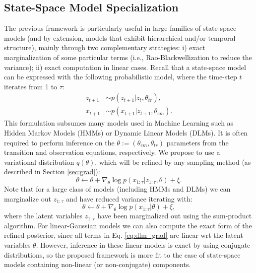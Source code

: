 \subsection{State-Space Model Specialization}\label{sec:ss}
The previous framework is particularly useful in large families of state-space models (and by extension, models that exhibit hierarchical and/or temporal structure), mainly through two complementary strategies: i) exact marginalization of some particular terms (i.e., Rao-Blackwellization \cite{murray2018delayed} to reduce the variance); ii) exact computation in linear cases. %
Recall that a state-space model \cite{hamilton1994state} can be expressed with the following probabilistic model, where the time-step $t$ iterates from 1 to $\tau$:
\begin{align*}
    z_{t+1} &\sim p(z_{t+1} | z_t, \theta_{tr}), \\
    x_{t+1} &\sim p(x_{t+1} | z_{t+1}, \theta_{em}).
\end{align*}
This formulation subsumes many models used in Machine Learning such as Hidden Markov Models (HMMs) or Dynamic Linear Models (DLMs). It is often required to perform inference on the $\theta := (\theta_{em}, \theta_{tr})$ parameters from the transition and observation equations, respectively. We propose to use a variational distribution $q(\theta)$, which will be refined by any sampling method (as described in Section \ref{sec:grad}):
\begin{equation}
\theta \leftarrow \theta + \nabla_{\theta} \log p(x_{1:\tau}|z_{1:\tau},\theta) + \xi.
\end{equation}
Note that for a large class of models (including HMMs and DLMs) we can marginalize out $z_{1:\tau}$ and have reduced variance iterating with:
\begin{equation}\label{eq:dlm_grad}
\theta \leftarrow \theta + \nabla_{\theta} \log p(x_{1:\tau}|\theta) + \xi,
\end{equation}
where the latent variables $z_{1:\tau}$ have been marginalized out using the sum-product algorithm. For linear-Gaussian models we can also compute the exact form of the refined posterior, since all terms in Eq. \ref{eq:dlm_grad} are linear wrt the latent variables $\theta$. However, inference in these linear models is exact by using conjugate distributions, so the proposed framework is more fit to the case of state-space models containing non-linear (or non-conjugate) components. %
\fi




